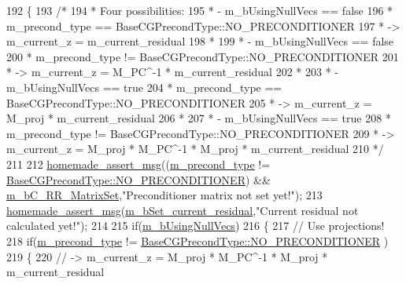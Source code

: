 \begin{DoxyCode}
192 \{
193     \textcolor{comment}{/*  }
194 \textcolor{comment}{     *  Four possibilities:}
195 \textcolor{comment}{     *   - m\_bUsingNullVecs == false}
196 \textcolor{comment}{     *     m\_precond\_type == BaseCGPrecondType::NO\_PRECONDITIONER}
197 \textcolor{comment}{     *     -> m\_current\_z = m\_current\_residual}
198 \textcolor{comment}{     *}
199 \textcolor{comment}{     *   - m\_bUsingNullVecs == false}
200 \textcolor{comment}{     *     m\_precond\_type != BaseCGPrecondType::NO\_PRECONDITIONER}
201 \textcolor{comment}{     *     -> m\_current\_z = M\_PC^-1 * m\_current\_residual}
202 \textcolor{comment}{     *}
203 \textcolor{comment}{     *   - m\_bUsingNullVecs == true}
204 \textcolor{comment}{     *     m\_precond\_type == BaseCGPrecondType::NO\_PRECONDITIONER}
205 \textcolor{comment}{     *     -> m\_current\_z = M\_proj * m\_current\_residual}
206 \textcolor{comment}{     *}
207 \textcolor{comment}{     *   - m\_bUsingNullVecs == true}
208 \textcolor{comment}{     *     m\_precond\_type != BaseCGPrecondType::NO\_PRECONDITIONER}
209 \textcolor{comment}{     *     -> m\_current\_z = M\_proj * M\_PC^-1 * M\_proj * m\_current\_residual}
210 \textcolor{comment}{     */}
211 
212     \hyperlink{common__header_8h_a593ccc80b790b2268653fcf6597bf451}{homemade\_assert\_msg}((\hyperlink{classcarl_1_1_f_e_t_i___operations_a76e474f6c1b8bb99cee6a6645f15b25b}{m\_precond\_type} != 
      \hyperlink{namespacecarl_ad52f21755b51ffa926038b59ae194ea8ad142a27fc7dfef6e36c5d01689880cc4}{BaseCGPrecondType::NO\_PRECONDITIONER}) && 
      \hyperlink{classcarl_1_1_f_e_t_i___operations_a1f272a523aba46755b2883394947bde0}{m\_bC\_RR\_MatrixSet},\textcolor{stringliteral}{"Preconditioner matrix not set yet!"});
213     \hyperlink{common__header_8h_a593ccc80b790b2268653fcf6597bf451}{homemade\_assert\_msg}(\hyperlink{classcarl_1_1_f_e_t_i___operations_a1f1f890054d63bdf25937e6bf66fa5ce}{m\_bSet\_current\_residual},\textcolor{stringliteral}{"Current residual
       not calculated yet!"});
214 
215     \textcolor{keywordflow}{if}(\hyperlink{classcarl_1_1_f_e_t_i___operations_aff68699ccceb6e1debc4ecab97dde2ff}{m\_bUsingNullVecs})
216     \{
217         \textcolor{comment}{// Use projections!}
218         \textcolor{keywordflow}{if}(\hyperlink{classcarl_1_1_f_e_t_i___operations_a76e474f6c1b8bb99cee6a6645f15b25b}{m\_precond\_type} != \hyperlink{namespacecarl_ad52f21755b51ffa926038b59ae194ea8ad142a27fc7dfef6e36c5d01689880cc4}{BaseCGPrecondType::NO\_PRECONDITIONER}
      )
219         \{
220             \textcolor{comment}{// -> m\_current\_z = M\_proj * M\_PC^-1 * M\_proj * m\_current\_residual}

\end{DoxyCode}
